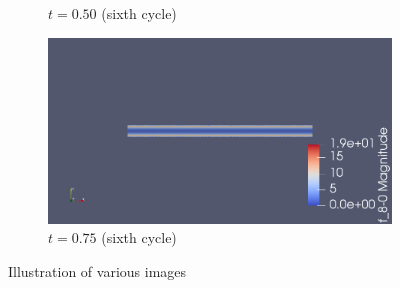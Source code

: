 \documentclass{article}
\begin{document}
\begin{figure}[ht]
\begin{subfigure}[b]{0.5\linewidth}
    \caption{$t=0.50$ (sixth cycle)} 
    \label{fig7:c} 
  \end{subfigure}%
  \begin{subfigure}[b]{0.5\linewidth}
    \centering
    \includegraphics[width=1\linewidth]{velocity_time_075.png} 
    \caption{$t=0.75$ (sixth cycle)} 
    \label{fig7:d} 
  \end{subfigure} 
  \caption{Illustration of various images}
  \label{fig7} 
\end{figure}
\end{document}
